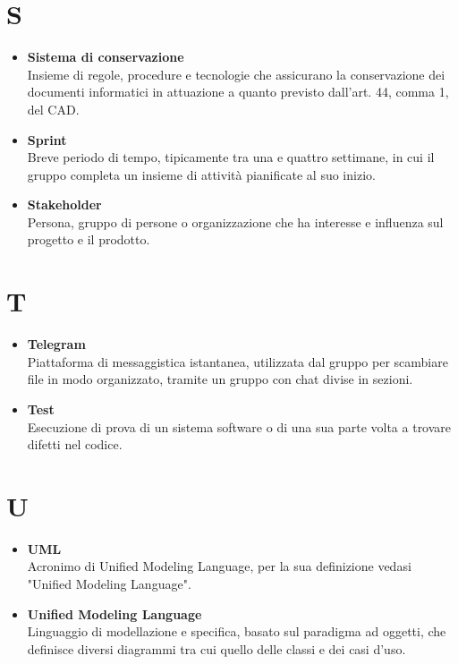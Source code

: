 \documentclass[a4paper,12pt]{article}
\begin{document}
        \section*{S} {
            \begin{itemize}
                \item \textbf{Sistema di conservazione}\\
                    Insieme di regole, procedure e tecnologie che assicurano la conservazione dei documenti informatici in attuazione a quanto previsto dall’art. 44, comma 1, del CAD.
                \item \textbf{Sprint}\\
                    Breve periodo di tempo, tipicamente tra una e quattro settimane, in cui il gruppo completa un insieme di attività pianificate al suo inizio.
                \item \textbf{Stakeholder}\\
                    Persona, gruppo di persone o organizzazione che ha interesse e influenza sul progetto e il prodotto.
            \end{itemize}
        }
        \newpage

        \section*{T} {
            \begin{itemize}
                \item \textbf{Telegram}\\
                    Piattaforma di messaggistica istantanea, utilizzata dal gruppo per scambiare file in modo organizzato, tramite un gruppo con chat divise in sezioni.
                \item \textbf{Test}\\
                    Esecuzione di prova di un sistema software o di una sua parte volta a trovare difetti nel codice.
            \end{itemize}
        }
        \newpage

        \section*{U} {
            \begin{itemize}
                \item \textbf{UML}\\
                    Acronimo di Unified Modeling Language, per la sua definizione vedasi "Unified Modeling Language".
                \item \textbf{Unified Modeling Language}\\
                    Linguaggio di modellazione e specifica, basato sul paradigma ad oggetti, che definisce diversi diagrammi tra cui quello delle classi e dei casi d'uso.

            \end{itemize}
        }
        \newpage
\end{document}
